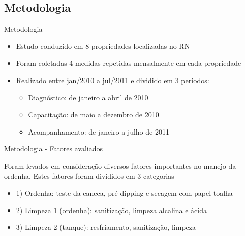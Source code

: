\documentclass{beamer}
\begin{document}
\subsection{Metodologia}
    \begin{frame}{Metodologia}
         \begin{itemize}
            \item Estudo conduzido em 8 propriedades localizadas no RN
            \item Foram coletadas 4 medidas repetidas mensalmente em cada propriedade
            \item Realizado entre jan/2010 a jul/2011 e dividido em 3 períodos:
              \begin{itemize}
                \item Diagnóstico: de janeiro a abril de 2010
                \item Capacitação: de maio a dezembro de 2010
                \item Acompanhamento: de janeiro a julho de 2011
              \end{itemize} 
         \end{itemize} 
     \end{frame}
     
     \begin{frame}{Metodologia - Fatores avaliados}
        \begin{block}{}
          Foram levados em consideração diversos fatores importantes no manejo da ordenha. Estes fatores foram divididos em 3 categorias
        \end{block}
     
     
         \begin{itemize}
                \item 1) Ordenha: teste da caneca, pré-dipping e secagem com papel toalha
                \item 2) Limpeza 1 (ordenha): sanitização, limpeza alcalina e ácida
                \item 3) Limpeza 2 (tanque): resfriamento, sanitização, limpeza
         \end{itemize} 
     \end{frame}
\end{document}
